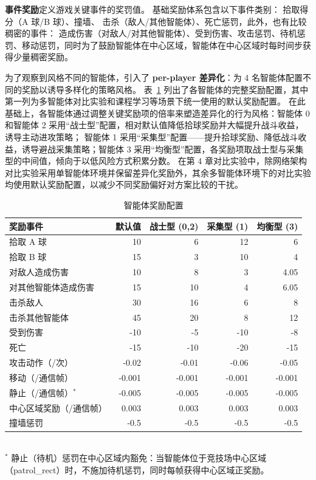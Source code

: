 \documentclass[12pt, a4paper, UTF8]{ctexart}
\numberwithin{equation}{section}
\begin{document}
\textbf{事件奖励}定义游戏关键事件的奖罚值。
基础奖励体系包含以下事件类别：
拾取得分（A 球/B 球）、撞墙、
击杀（敌人/其他智能体）、死亡惩罚，此外，也有比较稠密的事件：
造成伤害（对敌人/对其他智能体）、受到伤害、攻击惩罚、待机惩罚、移动惩罚，同时为了鼓励智能体在中心区域，智能体在中心区域时每时间步获得少量稠密奖励。

为了观察到风格不同的智能体，引入了 \textbf{per-player 差异化}：为 4 名智能体配置不同的奖励以诱导多样化的策略风格。
表~\ref{tab:reward_config} 列出了各智能体的完整奖励配置，其中第一列为多智能体对比实验和课程学习等场景下统一使用的默认奖励配置。
在此基础上，各智能体通过调整关键奖励项的倍率来塑造差异化的行为风格：智能体 0 和智能体 2 采用“战士型”配置，相对默认值降低拾球奖励并大幅提升战斗收益，诱导主动进攻策略；
智能体 1 采用“采集型”配置——提升拾球奖励、降低战斗收益，诱导避战采集策略；智能体 3 采用“均衡型”配置，各奖励项取战士型与采集型的中间值，倾向于以低风险方式积累分数。
在第 4 章对比实验中，除网络架构对比实验采用单智能体环境并保留差异化奖励外，其余多智能体环境下的对比实验均使用默认奖励配置，以减少不同奖励偏好对方案比较的干扰。

\begin{table}[htbp]
  \centering
  \caption{ 智能体奖励配置}
  \label{tab:reward_config}
  \begin{tabular}{lrrrr}
    \toprule
    奖励事件 & 默认值 & 战士型 (0,2) & 采集型 (1) & 均衡型 (3) \\
    \midrule
    拾取 A 球       & 10  & 6   & 12  & 6   \\
    拾取 B 球       & 15  & 3   & 10  & 4   \\
    对敌人造成伤害  & 10  & 8   & 3   & 4.05 \\
    对其他智能体造成伤害  & 15  & 10  & 4   & 6.05 \\
    击杀敌人        & 30  & 16  & 6   & 8   \\
    击杀其他智能体        & 45  & 20  & 8   & 12  \\
    受到伤害        & -10 & -5  & -10 & -8  \\
    死亡            & -15 & -10 & -20 & -15 \\
    攻击动作（/次） & -0.02 & -0.01 & -0.06 & -0.05 \\
    移动（/通信帧）     & -0.001 & -0.001 & -0.001 & -0.001 \\
    静止（/通信帧）$^*$ & -0.005 & -0.005 & -0.005 & -0.005 \\
    中心区域奖励（/通信帧） & 0.003 & 0.003 & 0.003 & 0.003 \\
    撞墙惩罚        & -0.5 & -0.5 & -0.5 & -0.5 \\
    \bottomrule
  \end{tabular}
  \\[4pt]
  \footnotesize $^*$ 静止（待机）惩罚在中心区域内豁免：当智能体位于竞技场中心区域（patrol\_rect）时，不施加待机惩罚，同时每帧获得中心区域正奖励。
\end{table}
\end{document}
